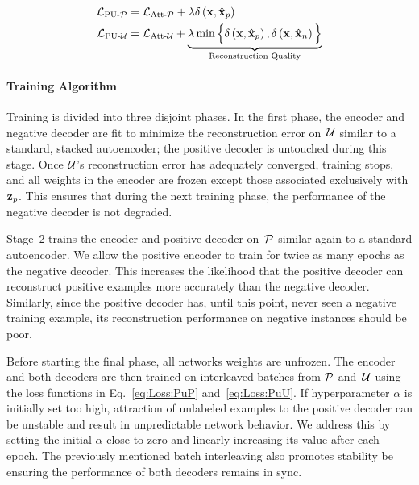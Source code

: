 \begin{align}
  \mathcal{L}_{\text{PU-}\mathcal{P}} &= \mathcal{L}_{\text{Att-}\mathcal{P}} + \lambda\delta\left(\mathbf{x}, \hat{\mathbf{x}}_{p}\right) \label{eq:Loss:PuP}\\
  \mathcal{L}_{\text{PU-}\mathcal{U}} &= \mathcal{L}_{\text{Att-}\mathcal{U}} + \underbrace{\lambda\min\Big\{\delta\left(\mathbf{x}, \hat{\mathbf{x}}_{p}\right), \delta\left(\mathbf{x}, \hat{\mathbf{x}}_{n}\right)\Big\}}_{\text{Reconstruction Quality}}\label{eq:Loss:PuU}
\end{align}


\paragraph{Training Algorithm} Training is divided into three disjoint phases.  In the first phase, the encoder and negative decoder are fit to minimize the reconstruction error on~$\mathcal{U}$ similar to a standard, stacked autoencoder; the positive decoder is untouched during this stage.  Once $\mathcal{U}$'s reconstruction error has adequately converged, training stops, and all weights in the encoder are frozen except those associated exclusively with $\mathbf{z}_{p}$.  This ensures that during the next training phase, the performance of the negative decoder is not degraded.

Stage~2 trains the encoder and positive decoder on~$\mathcal{P}$ similar again to a standard autoencoder.  We allow the positive encoder to train for twice as many epochs as the negative decoder.  This increases the likelihood that the positive decoder can reconstruct positive examples more accurately than the negative decoder.  Similarly, since the positive decoder has, until this point, never seen a negative training example, its reconstruction performance on negative instances should be poor.

Before starting the final phase, all networks weights are unfrozen. The encoder and both decoders are then trained on interleaved batches from $\mathcal{P}$ and~$\mathcal{U}$ using the loss functions in Eq.~\eqref{eq:Loss:PuP} and~\eqref{eq:Loss:PuU}.  If hyperparameter $\alpha$ is initially set too high, attraction of unlabeled examples to the positive decoder can be unstable and result in unpredictable network behavior. We address this by setting the initial $\alpha$ close to zero and linearly increasing its value after each epoch.  The previously mentioned batch interleaving also promotes stability be ensuring the performance of both decoders remains in sync.

%   

